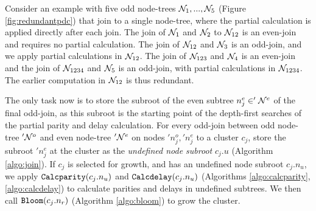 Consider an example with five odd node-trees $\mathcal{N}_1, ...,  \mathcal{N}_5$ (Figure \ref{fig:redundantpdc}) that join to a single node-tree, where the partial calculation is applied directly after each join. The join of $\mathcal{N}_1$ and $\mathcal{N}_2$ to $\mathcal{N}_{12}$ is an even-join and requires no partial calculation. The join of $\mathcal{N}_{12}$ and $\mathcal{N}_3$ is an odd-join, and we apply partial calculations in $\mathcal{N}_{12}$. The join of $\mathcal{N}_{123}$ and $\mathcal{N}_4$ is an even-join and the join of $\mathcal{N}_{1234}$ and $\mathcal{N}_5$ is an odd-join, with partial calculations in $\mathcal{N}_{1234}$. The earlier computation in $\mathcal{N}_{12}$ is thus redundant. 



The only task now is to store the subroot of the even subtree $n_j^e \in '\mathcal{N}^e$ of the final odd-join, as this subroot is the starting point of the depth-first searches of the partial parity and delay calculation. For every odd-join between odd node-tree $'\mathcal{N}^o$ and even node-tree $'\mathcal{N}^e$ on nodes $'n_j^o, 'n_j^e$ to a cluster $c_j$, store the subroot $'n^e_j$ at the cluster as the \emph{undefined node subroot} $c_j.u$ (Algorithm \ref{algo:join}). If $c_j$ is selected for growth, and has an undefined node subroot $c_j.n_u$, we apply $\texttt{Calcparity}(c_j.n_u)$ and $\texttt{Calcdelay}(c_j.n_u)$ (Algorithms \ref{algo:calcparity}, \ref{algo:calcdelay}) to calculate parities and delays in undefined subtrees. We then call $\texttt{Bloom}(c_j.n_r)$ (Algorithm \ref{algo:bloom}) to grow the cluster. 


